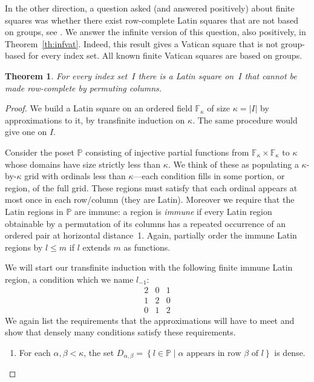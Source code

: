 \documentclass[12pt,a4paper]{article}
\newtheorem{thm}{Theorem}[section]
\newcommand{\F}{\mathbb{F}}
\newcommand{\st}{\; | \;}
\newcommand{\set}[2]{\left\{#1\st #2 \right\}}
\renewcommand{\P}{\mathbb{P}}
\begin{document}
In the other direction, a question asked (and answered positively) about finite squares was whether there exist row-complete Latin squares that are not based on groups, see \cite{CE91, DK15, Owens76}.  We answer the infinite version of this question, also positively, in Theorem~\ref{th:infvat}.  Indeed, this result gives a Vatican square that is not group-based for every index set.   All known finite Vatican squares are based on groups.

\begin{thm}\label{th:notrcls}
For every index set~$I$ there is a Latin square on~$I$ that cannot be made row-complete by permuting columns.
\end{thm}

\begin{proof}
We build a Latin square on an ordered field $\F_\kappa$ of size $\kappa=|I|$ by approximations to it, by transfinite induction on $\kappa$. The same procedure would give one on $I$.

Consider the poset $\P$ consisting of injective partial functions from $\F_\kappa\times\F_\kappa$ to $\kappa$ whose domains have size strictly less than $\kappa$. We think of these as populating a $\kappa$-by-$\kappa$ grid with ordinals less than $\kappa$---each condition fills in some portion, or region, of the full grid. These regions must satisfy that each ordinal appears at most once in each row/column (they are Latin). Moreover we require that the Latin regions in $\P$ are immune: a region is \textit{immune} if every Latin region  obtainable by a permutation of its columns has a repeated occurrence of an ordered pair at horizontal distance~1. Again, partially order the immune Latin regions by $l\leq m$ if $l$ extends $m$ as functions.

We will start our transfinite induction with the following finite immune Latin region, a condition which we name $l_{-1}$:
$$
\begin{array}{ccc}
2  & 0 & 1 \\ 
1 & 2 &  0  \\
 0  & 1 & 2 
\end{array}
$$
We again list the requirements that the approximations will have to meet and show that densely many conditions satisfy these requirements.
\begin{enumerate}
	\item For each $\alpha, \beta<\kappa$, the set $D_{\alpha,\beta}=\set{l \in \P}{\alpha \text{ appears in row } \beta \text{ of } l}$ is dense.
	

\end{enumerate}
\end{proof}
\end{document}
